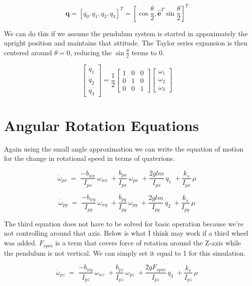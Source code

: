 \documentclass{article}
\begin{document}
$$\boldsymbol{q} = \left[ q_0, q_1, q_2, q_3 \right]^T 
= \left[ \cos\frac{\theta}{2}, \boldsymbol{\hat{e}}^T\sin\frac{\theta}{2} \right]^T$$ 

\noindent We can do this if we assume the pendulum system is started in appoximately 
the upright position and maintains that attitude. The Taylor series expansion 
is then centered around $\theta = 0$, reducing the $\sin\frac{\theta}{2}$ terms to $0$.

\[
\begin{bmatrix}
\dot{q}_1 \\
\dot{q}_2 \\
\dot{q}_3
\end{bmatrix}
=
\frac{1}{2}
\begin{bmatrix}
1 & 0 & 0\\
0 & 1 & 0 \\
0 & 0 & 1
\end{bmatrix}
\begin{bmatrix}
\omega_1 \\
\omega_2 \\
\omega_3
\end{bmatrix}
\]

\section*{\small Angular Rotation Equations}
\noindent Again using the small angle approximation we can write the equation
of motion for the change in rotational speed in terms of quaterions.

$$\dot{\omega}_{px}\; =\;
\frac{-b_{wx}}{I_{px}}\,\omega_{wx}\;
+ \frac{b_{px}}{I_{px}}\,\omega_{px}\;
+ \frac{2glm}{I_{px}}\,q_1\;
+ \frac{k_s}{I_{px}}\,\mu$$

$$\dot{\omega}_{py}\; =\;
\frac{-b_{wy}}{I_{py}}\,\omega_{wy}\;
+ \frac{b_{py}}{I_{py}}\,\omega_{py}\;
+ \frac{2glm}{I_{py}}\,q_2\;
+ \frac{k_s}{I_{py}}\,\mu$$

\noindent The third equation does not have to be solved for basic operation because
we're not controlling around that axis. Below is what I think may work if 
a third wheel was added. $F_{spin}$ is a term that covers force of rotation around
the Z-axis while the pendulum is not vertical. We can simply set it equal
to 1 for this simulation.

$$\dot{\omega}_{pz}\; =\;
\frac{-b_{wy}}{I_{pz}}\,\omega_{wz}\;
+ \frac{b_{pz}}{I_{pz}}\,\omega_{pz}\;
+ \frac{2gF_{spin}}{I_{pz}}\,q_3\;
+ \frac{k_s}{I_{pz}}\,\mu$$
\end{document}

